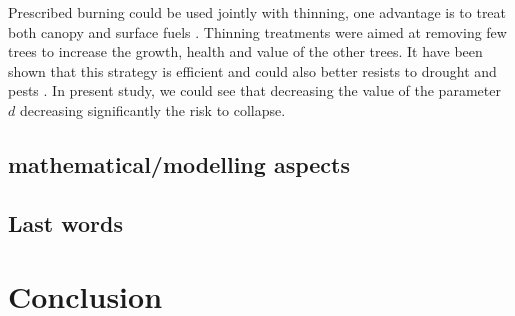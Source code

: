 \documentclass{article}
\begin{document}
Prescribed burning could be used jointly with thinning, one advantage is to treat both canopy and surface fuels \citep{kalies_tamm_2016, agee_basic_2005}. Thinning treatments were aimed at removing few trees to increase the growth, health and value of the other trees. It have been shown that this strategy is efficient \citep{hurteau2008carbon} and could also better resists to drought \citep{d2013effects} and pests \citep{waring2005silvicultural}. In present study, we could see that decreasing the value of the parameter $d$ decreasing significantly the risk to collapse.




\subsection{ mathematical/modelling aspects}


\subsection{Last words}

\todo{}






\newpage

\section*{Conclusion}





\end{document}
